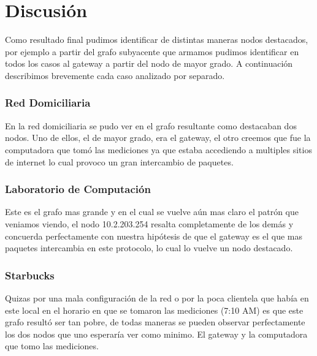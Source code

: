 \section{Discusión}

Como resultado final pudimos identificar de distintas maneras nodos destacados, por ejemplo a partir del grafo subyacente que armamos pudimos identificar en todos los casos al gateway a partir del nodo de mayor grado. A continuación describimos brevemente cada caso analizado por separado.

\subsubsection{Red Domiciliaria}

En la red domiciliaria se pudo ver en el grafo resultante como destacaban dos nodos. Uno de ellos, el de mayor grado, era el gateway, el otro creemos que fue la computadora que tomó las mediciones ya que estaba accediendo a multiples sitios de internet lo cual provoco un gran intercambio de paquetes.

\subsubsection{Laboratorio de Computación}

Este es el grafo mas grande y en el cual se vuelve aún mas claro el patrón que veniamos viendo, el nodo 10.2.203.254 resalta completamente de los demás y concuerda perfectamente con nuestra hipótesis de que el gateway es el que mas paquetes intercambia en este protocolo, lo cual lo vuelve un nodo destacado.

\subsubsection{Starbucks}

Quizas por una mala configuración de la red o por la poca clientela que había en este local en el horario en que se tomaron las mediciones (7:10 AM) es que este grafo resultó ser tan pobre, de todas maneras se pueden observar perfectamente los dos nodos que uno esperaría ver como minimo. El gateway y la computadora que tomo las mediciones.
